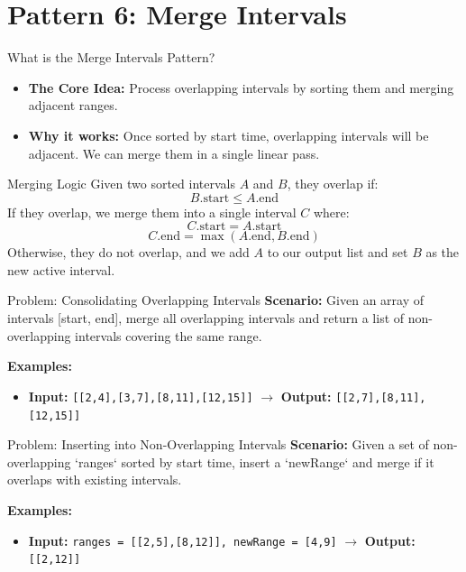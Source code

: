 \section{Pattern 6: Merge Intervals}

\begin{frame}[c]{\empty}
    \begin{center}
        \Large\textbf{\secname}
    \end{center}
\end{frame}

\begin{frame}{What is the Merge Intervals Pattern?}
  \begin{itemize}
    \item \textbf{The Core Idea:} Process overlapping intervals by sorting them and merging adjacent ranges.
    \item \textbf{Why it works:} Once sorted by start time, overlapping intervals will be adjacent. We can merge them in a single linear pass.
  \end{itemize}
\end{frame}

\begin{frame}{Merging Logic}
  Given two sorted intervals $A$ and $B$, they overlap if:
  $$B.\text{start} \le A.\text{end}$$
  If they overlap, we merge them into a single interval $C$ where:
  $$C.\text{start} = A.\text{start}$$
  $$C.\text{end} = \max(A.\text{end}, B.\text{end})$$
  Otherwise, they do not overlap, and we add $A$ to our output list and set $B$ as the new active interval.
\end{frame}

\begin{frame}[fragile]{Problem: Consolidating Overlapping Intervals}
  \textbf{Scenario:}
  Given an array of intervals [start, end], merge all overlapping intervals and return a list of non-overlapping intervals covering the same range.
  
  \vspace{0.3cm}
  \textbf{Examples:}
  \begin{itemize}
    \item \textbf{Input:} \texttt{[[2,4],[3,7],[8,11],[12,15]]} $\rightarrow$ \textbf{Output:} \texttt{[[2,7],[8,11],[12,15]]}
  \end{itemize}
\end{frame}

\begin{frame}[fragile]{Problem: Inserting into Non-Overlapping Intervals}
  \textbf{Scenario:}
  Given a set of non-overlapping `ranges` sorted by start time, insert a `newRange` and merge if it overlaps with existing intervals.
  
  \vspace{0.3cm}
  \textbf{Examples:}
  \begin{itemize}
    \item \textbf{Input:} \texttt{ranges = [[2,5],[8,12]], newRange = [4,9]} $\rightarrow$ \textbf{Output:} \texttt{[[2,12]]}
  \end{itemize}
\end{frame}

